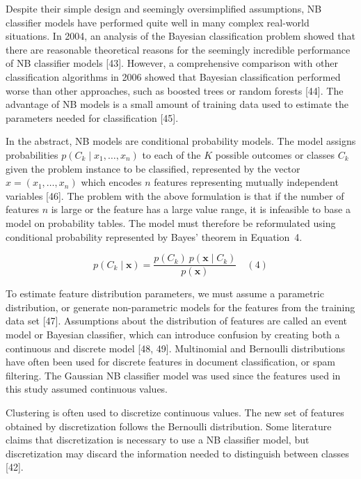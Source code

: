 \documentclass[sn-mathphys-num]{sn-jnl}%
\begin{document}
Despite their simple design and seemingly oversimplified assumptions, NB classifier models have performed quite well in many complex real-world situations. In 2004, an analysis of the Bayesian classification problem showed that there are reasonable theoretical reasons for the seemingly incredible performance of NB classifier models [43]. However, a comprehensive comparison with other classification algorithms in 2006 showed that Bayesian classification performed worse than other approaches, such as boosted trees or random forests [44]. The advantage of NB models is a small amount of training data used to estimate the parameters needed for classification [45].

In the abstract, NB models are conditional probability models. The model assigns probabilities $p(C_{k}\mid x_{1},\ldots, x_{n})$ to each of the $K$ possible outcomes or classes $C_{k}$ given the problem instance to be classified, represented by the vector $x = (x_{1},\ldots, x_{n})$ which encodes $n$ features representing mutually independent variables [46]. The problem with the above formulation is that if the number of features $n$ is large or the feature has a large value range, it is infeasible to base a model on probability tables. The model must therefore be reformulated using conditional probability represented by Bayes' theorem in Equation~4.

\begin{equation}
	p(C_{k}\mid \mathbf{x})={\frac{p(C_{k})\ p(\mathbf{x} \mid C_{k})}{p(\mathbf{x})}}
	\quad\left(4\right)
\end{equation}

To estimate feature distribution parameters, we must assume a parametric distribution, or generate non-parametric models for the features from the training data set [47]. Assumptions about the distribution of features are called an event model or Bayesian classifier, which can introduce confusion by creating both a continuous and discrete model [48, 49]. Multinomial and Bernoulli distributions have often been used for discrete features in document classification, or spam filtering. The Gaussian NB classifier model was used since the features used in this study assumed continuous values.

Clustering is often used to discretize continuous values. The new set of features obtained by discretization follows the Bernoulli distribution. Some literature claims that discretization is necessary to use a NB classifier model, but discretization may discard the information needed to distinguish between classes [42].
\end{document}
